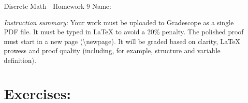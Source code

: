 \documentclass[12pt]{article}
\begin{document}
\begin{center}
    {\LARGE Discrete Math - Homework 9}  \Large \newline
    Name:
\end{center}

\noindent \emph{Instruction summary:} Your work must be uploaded to Gradescope as a single PDF file. It must be typed in LaTeX to avoid a 20\% penalty. The polished proof must start in a new page (\textbackslash{newpage}). It will be graded based on clarity, LaTeX prowess and proof quality (including, for example, structure and variable definition).

\section*{Exercises:}
\end{document}
